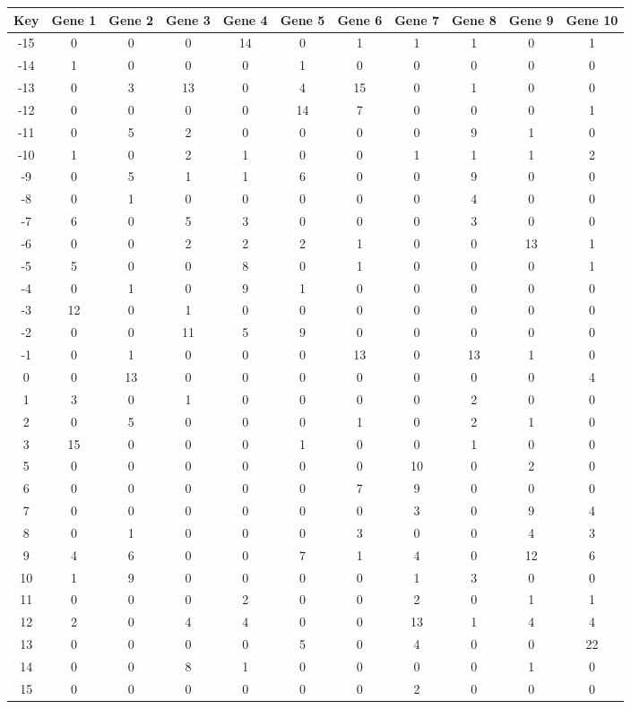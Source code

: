\begin{tabular}{|c|c|c|c|c|c|c|c|c|c|c|}
\hline
Key & Gene 1 & Gene 2 & Gene 3 & Gene 4 & Gene 5 & Gene 6 & Gene 7 & Gene 8 & Gene 9 & Gene 10 \\
\hline
-15 & 0 & 0 & 0 & 14 & 0 & 1 & 1 & 1 & 0 & 1 \\
-14 & 1 & 0 & 0 & 0 & 1 & 0 & 0 & 0 & 0 & 0 \\
-13 & 0 & 3 & 13 & 0 & 4 & 15 & 0 & 1 & 0 & 0 \\
-12 & 0 & 0 & 0 & 0 & 14 & 7 & 0 & 0 & 0 & 1 \\
-11 & 0 & 5 & 2 & 0 & 0 & 0 & 0 & 9 & 1 & 0 \\
-10 & 1 & 0 & 2 & 1 & 0 & 0 & 1 & 1 & 1 & 2 \\
-9 & 0 & 5 & 1 & 1 & 6 & 0 & 0 & 9 & 0 & 0 \\
-8 & 0 & 1 & 0 & 0 & 0 & 0 & 0 & 4 & 0 & 0 \\
-7 & 6 & 0 & 5 & 3 & 0 & 0 & 0 & 3 & 0 & 0 \\
-6 & 0 & 0 & 2 & 2 & 2 & 1 & 0 & 0 & 13 & 1 \\
-5 & 5 & 0 & 0 & 8 & 0 & 1 & 0 & 0 & 0 & 1 \\
-4 & 0 & 1 & 0 & 9 & 1 & 0 & 0 & 0 & 0 & 0 \\
-3 & 12 & 0 & 1 & 0 & 0 & 0 & 0 & 0 & 0 & 0 \\
-2 & 0 & 0 & 11 & 5 & 9 & 0 & 0 & 0 & 0 & 0 \\
-1 & 0 & 1 & 0 & 0 & 0 & 13 & 0 & 13 & 1 & 0 \\
0 & 0 & 13 & 0 & 0 & 0 & 0 & 0 & 0 & 0 & 4 \\
1 & 3 & 0 & 1 & 0 & 0 & 0 & 0 & 2 & 0 & 0 \\
2 & 0 & 5 & 0 & 0 & 0 & 1 & 0 & 2 & 1 & 0 \\
3 & 15 & 0 & 0 & 0 & 1 & 0 & 0 & 1 & 0 & 0 \\
5 & 0 & 0 & 0 & 0 & 0 & 0 & 10 & 0 & 2 & 0 \\
6 & 0 & 0 & 0 & 0 & 0 & 7 & 9 & 0 & 0 & 0 \\
7 & 0 & 0 & 0 & 0 & 0 & 0 & 3 & 0 & 9 & 4 \\
8 & 0 & 1 & 0 & 0 & 0 & 3 & 0 & 0 & 4 & 3 \\
9 & 4 & 6 & 0 & 0 & 7 & 1 & 4 & 0 & 12 & 6 \\
10 & 1 & 9 & 0 & 0 & 0 & 0 & 1 & 3 & 0 & 0 \\
11 & 0 & 0 & 0 & 2 & 0 & 0 & 2 & 0 & 1 & 1 \\
12 & 2 & 0 & 4 & 4 & 0 & 0 & 13 & 1 & 4 & 4 \\
13 & 0 & 0 & 0 & 0 & 5 & 0 & 4 & 0 & 0 & 22 \\
14 & 0 & 0 & 8 & 1 & 0 & 0 & 0 & 0 & 1 & 0 \\
15 & 0 & 0 & 0 & 0 & 0 & 0 & 2 & 0 & 0 & 0 \\
\hline
\end{tabular}